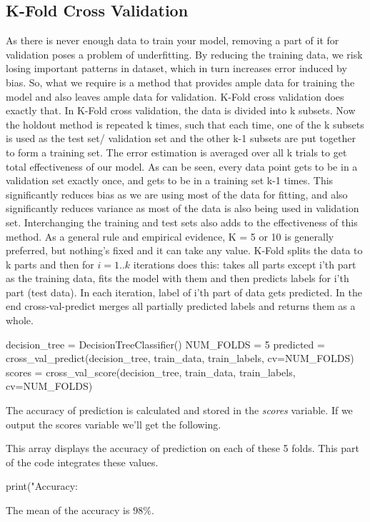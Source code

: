 \documentclass[12pt]{article}
\numberwithin{equation}{section}
\numberwithin{table}{section}
\numberwithin{figure}{section}
\begin{document}
\subsection{K-Fold Cross Validation}
As there is never enough data to train your model, removing a part of it for validation poses a problem of underfitting. By reducing the training data, we risk losing important patterns in dataset, which in turn increases error induced by bias. So, what we require is a method that provides ample data for training the model and also leaves ample data for validation. K-Fold cross validation does exactly that. In K-Fold cross validation, the data is divided into k subsets. Now the holdout method is repeated k times, such that each time, one of the k subsets is used as the test set/ validation set and the other k-1 subsets are put together to form a training set. The error estimation is averaged over all k trials to get total effectiveness of our model. As can be seen, every data point gets to be in a validation set exactly once, and gets to be in a training set k-1 times. This significantly reduces bias as we are using most of the data for fitting, and also significantly reduces variance as most of the data is also being used in validation set. Interchanging the training and test sets also adds to the effectiveness of this method. As a general rule and empirical evidence, K = 5 or 10 is generally preferred, but nothing’s fixed and it can take any value\cite{cross_validation}. K-Fold splits the data to k parts and then for $i=1..k$ iterations does this: takes all parts except i'th part as the training data, fits the model with them and then predicts labels for i'th part (test data). In each iteration, label of i'th part of data gets predicted. In the end cross-val-predict merges all partially predicted labels and returns them as a whole.
\begin{python}
	decision_tree = DecisionTreeClassifier()
	NUM_FOLDS = 5
	predicted = cross_val_predict(decision_tree, train_data, train_labels, cv=NUM_FOLDS)
	scores = cross_val_score(decision_tree, train_data, train_labels, cv=NUM_FOLDS)
\end{python}
The accuracy of prediction is calculated and stored in the \textit{scores} variable. If we output the scores variable we'll get the following.
\begin{python}
	[0.95031056    0.99378882    0.99375    0.99367089    0.96815287]
\end{python}
This array displays the accuracy of prediction on each of these 5 folds. This part of the code integrates these values.
\begin{python}
	print("Accuracy: %
\end{python}
The mean of the accuracy is $98\%$.
\end{document}
